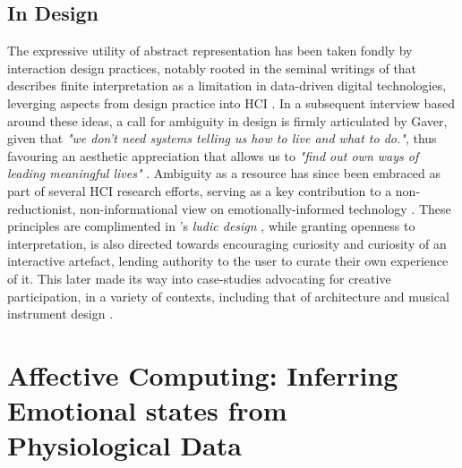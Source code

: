 \subsection{In Design}

The expressive utility of abstract representation has been taken fondly by interaction design practices, notably rooted in the seminal writings of \citeauthor{gaver_ambiguity_2003} that describes finite interpretation as a limitation in data-driven digital technologies, leverging aspects from design practice into HCI \cite{gaver_ambiguity_2003}. In a subsequent interview based around these ideas, a call for ambiguity in design is firmly articulated by Gaver, given that \textit{"we don’t need systems telling us how to live and what to do."}, thus favouring an aesthetic appreciation that allows us to \textit{"find out own ways of leading meaningful lives"} \cite{gaver_gaffney_2007}. Ambiguity as a resource has since been embraced as part of several HCI research efforts, serving as a key contribution to a non-reductionist, non-informational view on emotionally-informed technology \cite{sanches_ambiguity_2019,howell_biosignals_2016,stahl_evocative_2014}. These principles are complimented in \citeauthor{gaver_drift_2004}'s \textit{ludic design} \cite{gaver_drift_2004}, while granting openness to interpretation, is also directed towards encouraging curiosity and curiosity of an interactive artefact, lending authority to the user to curate their own experience of it. This later made its way into case-studies advocating for creative participation, in a variety of contexts, including that of architecture and musical instrument design \cite{harriss_ludic_2010,mcpherson_designing_2016}.




\section{Affective Computing: Inferring Emotional states from Physiological Data}
\label{alit_review:affective_computing}


